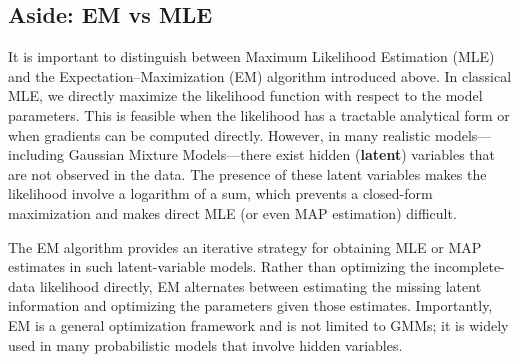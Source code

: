 \documentclass{article}
\begin{document}

\subsection{Aside: EM vs MLE}

It is important to distinguish between Maximum Likelihood Estimation (MLE) and the Expectation–Maximization (EM) algorithm introduced above. In classical MLE, we directly maximize the likelihood function with respect to the model parameters. This is feasible when the likelihood has a tractable analytical form or when gradients can be computed directly. However, in many realistic models—including Gaussian Mixture Models—there exist hidden (\textbf{latent}) variables that are not observed in the data. The presence of these latent variables makes the likelihood involve a logarithm of a sum, which prevents a closed-form maximization and makes direct MLE (or even MAP estimation) difficult.

The EM algorithm provides an iterative strategy for obtaining MLE or MAP estimates in such latent-variable models. Rather than optimizing the incomplete-data likelihood directly, EM alternates between estimating the missing latent information and optimizing the parameters given those estimates. Importantly, EM is a general optimization framework and is not limited to GMMs; it is widely used in many probabilistic models that involve hidden variables.
\end{document}
